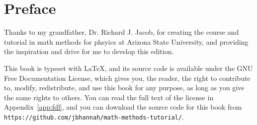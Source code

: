 \chapter{Preface}

Thanks to my grandfather, Dr. Richard J. Jacob, for creating the course and
tutorial in math methods for phsyics at Arizona State University, and providing
the inspiration and drive for me to develop this edition.

This book is typeset with \LaTeX, and its source code is available under the GNU
Free Documentation License, which gives you, the reader, the right to contribute
to, modify, redistribute, and use this book for any purpose, as long as you give
the same rights to others. You can read the full text of the license in
Appendix~\ref{app:fdl}, and you can download the source code for this book from
\texttt{https://github.com/jbhannah/math-methods-tutorial/}.
